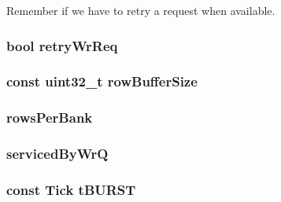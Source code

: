 \label{classDRAMCtrl_aa4e05579e39e0e1ae7859ddba8538932}
Remember if we have to retry a request when available. \hypertarget{classDRAMCtrl_acf0d3616b5317008b8248aa2245df220}{
\subsubsection[{retryWrReq}]{\setlength{\rightskip}{0pt plus 5cm}bool {\bf retryWrReq}}}
\label{classDRAMCtrl_acf0d3616b5317008b8248aa2245df220}
\hypertarget{classDRAMCtrl_abe6f704496dadf8c0b246eb57b4e25d5}{
\subsubsection[{rowBufferSize}]{\setlength{\rightskip}{0pt plus 5cm}const {\bf uint32\_\-t} {\bf rowBufferSize}}}
\label{classDRAMCtrl_abe6f704496dadf8c0b246eb57b4e25d5}
\hypertarget{classDRAMCtrl_ad878fffffe428b1673a17f489f5a4e94}{
\subsubsection[{rowsPerBank}]{ {\bf rowsPerBank}}}
\label{classDRAMCtrl_ad878fffffe428b1673a17f489f5a4e94}
\hypertarget{classDRAMCtrl_a234c092fa122ea27676236c3b6f11bcb}{
\subsubsection[{servicedByWrQ}]{ {\bf servicedByWrQ}}}
\label{classDRAMCtrl_a234c092fa122ea27676236c3b6f11bcb}
\hypertarget{classDRAMCtrl_a15520c5298cfcc33032b7f0e363f7a3d}{
\subsubsection[{tBURST}]{\setlength{\rightskip}{0pt plus 5cm}const {\bf Tick} {\bf tBURST}}}
